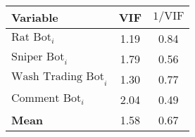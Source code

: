 \begin{tabular}{lcc}
\toprule
Variable & VIF & $1/\text{VIF}$ \\
\midrule
$\text{Rat Bot}_{i}$ & 1.19 & 0.84 \\
$\text{Sniper Bot}_{i}$ & 1.79 & 0.56 \\
$\text{Wash Trading Bot}_{i}$ & 1.30 & 0.77 \\
$\text{Comment Bot}_{i}$ & 2.04 & 0.49 \\
\midrule
\textbf{Mean} & 1.58 & 0.67 \\
\bottomrule
\end{tabular}